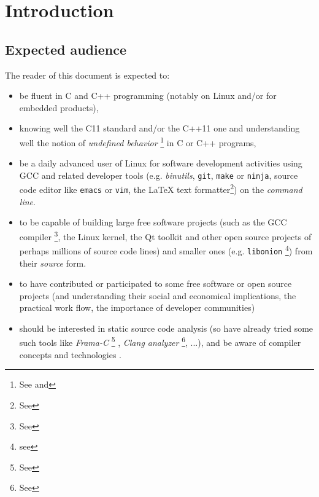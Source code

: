 \section{Introduction}


\subsection{Expected audience}

The reader of this document is expected to:
\begin{itemize}

  \item be fluent in C \cite{Kernighan:1988:CPL} and C++
    \cite{Stroustrup:2014:CplusPlus} programming (notably on Linux
    and/or for embedded products),

  \item knowing well the C11 standard
    \cite{C11:std,Memarian:2016:PLDI} and/or the C++11 one
    \cite{CplusPlus11:std} and understanding well the notion of
    \emph{undefined behavior} \footnote{See
      and } in C or C++
    programs,

  \item be a daily advanced user of Linux for software development
    activities using GCC and related developer tools
    (e.g. \textit{binutils}, \texttt{git}, \texttt{make} or
    \texttt{ninja}, source code editor like \texttt{emacs} or
    \texttt{vim}, the {\LaTeX} text formatter\footnote{See
      }) on the \emph{command
      line}.


\item to be capable of building large free software projects (such as
  the GCC compiler \cite{gcc-internals} \footnote{See
    }, the Linux kernel, the Qt toolkit and
  other open source projects of perhaps millions of source code lines)
  and smaller ones (e.g. \texttt{libonion} \footnote{see
    }) from their \emph{source}
  form.

\item to have contributed or participated to some free software or
  open source projects (and understanding their social and economical
  \cite{Weber:2004:SuccessOpenSource} implications, the practical work
  flow, the importance of developer communities)
  
\item should be interested in static source code analysis (so have
  already tried some such tools like \emph{Frama-C} \footnote{See
    } \cite{Cuoq:2012:Frama-C}, \emph{Clang
    analyzer} \footnote{See },
  ...), and be aware of compiler concepts and technologies \cite{Aho:2006:DragonBook}.


\end{itemize}
